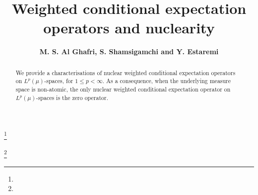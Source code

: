 \documentclass{amsart}
\theoremstyle{definition}\newtheorem{defn}[thm]{Definition}
\theoremstyle{remark}
\numberwithin{equation}{section}
\begin{document}
\title[]
{Weighted conditional expectation operators and nuclearity}

\author{\sc\bf M. S. Al Ghafri, S. Shamsigamchi and Y. Estaremi }
\address{\sc M. S. Al Ghafri, S. Shamsigamchi and Y. Estaremi}
\address{Department of Mathematics, University of Technology and Applied Sciences, Rustaq {329},  Oman.}
\address{Department of Mathematics, Payame Noor(PNU) university, Tehran, Iran.}
\address{Department of Mathematics and Computer Sciences,
Golestan University, Gorgan, Iran.}

\thanks{}

\thanks{}



\date{}

\dedicatory{}

\commby{}

\begin{abstract}
We provide a characterisations of nuclear weighted conditional expectation operators on $L^p(\mu)$-spaces, for $1\leq p<\infty$. As a consequence, when the underlying measure space is non-atomic, the only nuclear weighted conditional expectation operator on $L^p(\mu)$-spaces is the zero operator.
\end{abstract}

\maketitle
\end{document}

